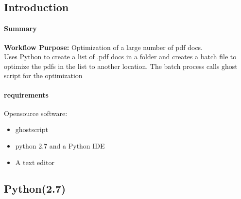 \documentclass[class=article , crop=false, titlepage, twoside, multi={itemize, figure, verbatim}, float=false]{standalone}
\title{}  %
\begin{document}

\ifstandalone
\maketitle %
\clearpage
\tableofcontents %
\clearpage
\fi

\clearpage

\subsection{Introduction}
\paragraph{Summary}
\textbf{Workflow Purpose:}  Optimization of a large number of pdf docs.\\
Uses Python to create a list of .pdf docs in a folder and creates a batch file to optimize the pdfs in the list to another location.  The batch process calls ghost script for the optimization
\paragraph{requirements}
Opensource software:
\begin{itemize}
\item ghostscript 
\item python 2.7 and a Python IDE 
\item A text editor
\end{itemize}
\subsection{Python(2.7)}
\end{document}
